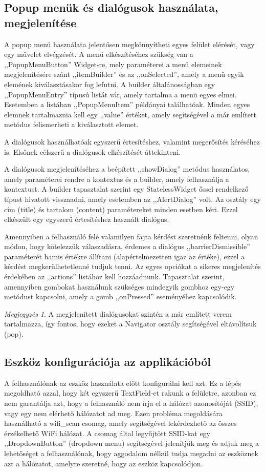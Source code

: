 \documentclass{thesis-ekf}
\theoremstyle{definition}
\theoremstyle{remark}
\newtheorem{megjegyzes}{Megjegyzés}
\begin{document}
	\subsection{Popup menük és dialógusok használata, megjelenítése}
	A popup menü használata jelentősen megkönnyítheti egyes felület elérését, vagy egy művelet elvégzését.
	A menü elkészítéséhez szükség van a ,,PopupMenuButton'' Widget-re, mely paraméterei a menü elemeinek megjelenítésére szánt ,,itemBuilder'' és az ,,onSelected'', amely a menü egyik elemének kiválasztásakor fog lefutni.
	A builder általánosságban egy ,,PopupMenuEntry'' típusú listát vár, amely tartalma a menü egyes elmei. Esetemben a listában ,,PopupMenuItem'' példányai találhatóak. Minden egyes elemnek tartalmaznia kell egy ,,value'' értéket, amely segítségével a már említett metódus felismerheti a kiválasztott elemet.
	
	A dialógusok használhatóak egyszerű értesítéshez, valamint megerősítés kéréséhez is. Elsőnek célszerű a dialógusok elkészítését áttekinteni.
	
	A dialógusok megjelenítéséhez a beépített ,,showDialog'' metódus használatos, amely paraméterei rendre a kontextus és a builder, amely felhasználja a kontextust. A builder tapasztalat szerint egy StatelessWidget őssel rendelkező típust hivatott visszaadni, amely esetemben az ,,AlertDialog'' volt. Az osztály egy cím (title) és tartalom (content) paramétereket minden esetben kéri. Ezzel elkészült egy egyszerű értesítéshez használt dialógus.
	
	Amennyiben a felhasználó felé valamilyen fajta kérdést szeretnénk feltenni, olyan módon, hogy kötelezzük válaszadásra, érdemes a dialógus ,,barrierDismissible'' paraméterét hamis értékre állítani (alapértelmezetten igaz az értéke), ezzel a kérdést megkerülhetetlenné tudjuk tenni. Az egyes opciókat a sikeres megjelenítés érdekében az ,,actions'' listához kell hozzáadnunk. Tapasztalat szerint, amennyiben gombokat használunk szükséges mindegyik gombhoz egy-egy metódust kapcsolni, amely a gomb ,,onPressed'' eseményéhez kapcsolódik.
	\begin{megjegyzes}
		A megjelenített dialógusokat szintén a már említett verem tartalmazza, így fontos, hogy ezeket a Navigator osztály segítségével eltávolítsuk (pop).
	\end{megjegyzes}
	\subsection{Eszköz konfigurációja az applikációból}
	A felhasználónak az eszköz használata előtt konfigurálni kell azt. Ez a lépés megoldható azzal, hogy két egyszerű TextField-et rakunk a felületre, azonban ez nem garantálja azt, hogy a felhasználó nem írja el a hálózat azonosítóját (SSID), vagy egy nem elérhető hálózatot ad meg. Ezen probléma megoldására használható a wifi\_scan\cite{bib_flutter_wifi} csomag, amely segítségével lekérdezhető az összes érzékelhető WiFi hálózat. A csomag által legyűjtött SSID-kat egy ,,DropdownButton'' (dropdown menu) segítségével jelenítjük meg és adjuk meg a lehetőséget a felhasználónak, hogy aggodalom nélkül tudja megadni az eszköznek azt a hálózatot, amelyre szeretné, hogy az eszköz kapcsolódjon.
\end{document}
